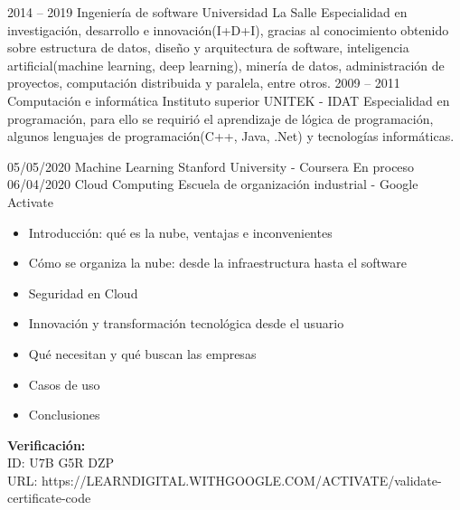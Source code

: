 
\begin{entrylist}
	\entry
		{2014 -- 2019}
		{Ingeniería de software}
		{Universidad La Salle}
		{Especialidad en investigación, desarrollo e innovación(I+D+I), gracias al conocimiento obtenido sobre estructura de datos, diseño y arquitectura de software, inteligencia artificial(machine learning, deep learning), minería de datos, administración de proyectos, computación distribuida y paralela, entre otros.}
	\entry
		{2009 -- 2011}
		{Computación e informática}
		{Instituto superior UNITEK - IDAT}
		{Especialidad en programación, para ello se requirió el aprendizaje de lógica de programación, algunos lenguajes de programación(C++, Java, .Net) y tecnologías informáticas.}
\end{entrylist}

\begin{entrylist}
	\entry
		{05/05/2020}
		{Machine Learning}
		{Stanford University - Coursera}
		{En proceso}
	\entry
		{06/04/2020}
		{Cloud Computing}
		{Escuela de organización industrial - Google Activate}
		{
		    \vspace{-5mm}
		    \begin{itemize}
		        \setlength\itemsep{0pt}
    	        \setlength\parskip{0pt}
		        \item Introducción: qué es la nube, ventajas e inconvenientes
		        \item Cómo se organiza la nube: desde la infraestructura hasta el software
		        \item Seguridad en Cloud
		        \item Innovación y transformación tecnológica desde el usuario
		        \item Qué necesitan y qué buscan las empresas
		        \item Casos de uso
		        \item Conclusiones
		    \end{itemize}
		    
		    \textbf{Verificación:} \\
		    ID: U7B G5R DZP \\
		    URL: https://LEARNDIGITAL.WITHGOOGLE.COM/ACTIVATE/validate-certificate-code
		}
\end{entrylist}